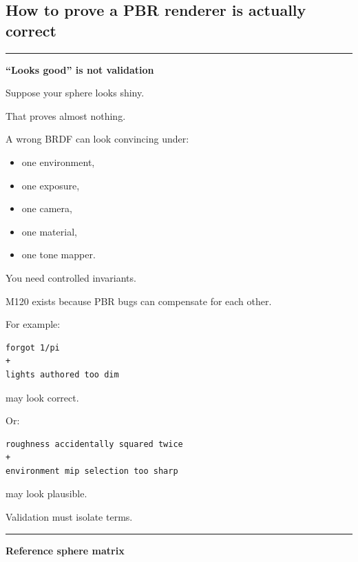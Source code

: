 \hypertarget{03-visual-computing-i-ch006-parts-19962000}{}

\subsection{How to prove a PBR renderer is actually correct}\label{03-visual-computing-i-ch006-how-to-prove-a-pbr-renderer-is-actually-correct}

\hypertarget{03-visual-computing-i-ch006-how-to-prove-a-pbr-renderer-is-actually-correct}{}

\begin{center}\rule{0.5\linewidth}{0.5pt}\end{center}

\textbf{``Looks good'' is not validation}

Suppose your sphere looks shiny.

That proves almost nothing.

A wrong BRDF can look convincing under:

\begin{itemize}
\tightlist
\item
  one environment,
\item
  one exposure,
\item
  one camera,
\item
  one material,
\item
  one tone mapper.
\end{itemize}

You need controlled invariants.

M120 exists because PBR bugs can compensate for each other.

For example:

\begin{verbatim}
forgot 1/pi
+
lights authored too dim
\end{verbatim}

may look correct.

Or:

\begin{verbatim}
roughness accidentally squared twice
+
environment mip selection too sharp
\end{verbatim}

may look plausible.

Validation must isolate terms.

\begin{center}\rule{0.5\linewidth}{0.5pt}\end{center}

\textbf{Reference sphere matrix}

